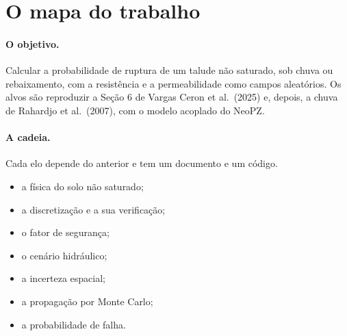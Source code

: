 \section{O mapa do trabalho}
\label{sec:mapa}

\paragraph{O objetivo.} Calcular a probabilidade de ruptura de um talude não saturado, sob chuva ou rebaixamento, com a
resistência e a permeabilidade como campos aleatórios. Os alvos são reproduzir a Seção 6 de Vargas Ceron et al.\ (2025)
e, depois, a chuva de Rahardjo et al.\ (2007), com o modelo acoplado do NeoPZ.

\paragraph{A cadeia.} Cada elo depende do anterior e tem um documento e um código.
\begin{itemize}
  \item a física do solo não saturado;
  \item a discretização e a sua verificação;
  \item o fator de segurança;
  \item o cenário hidráulico;
  \item a incerteza espacial;
  \item a propagação por Monte Carlo;
  \item a probabilidade de falha.
\end{itemize}

